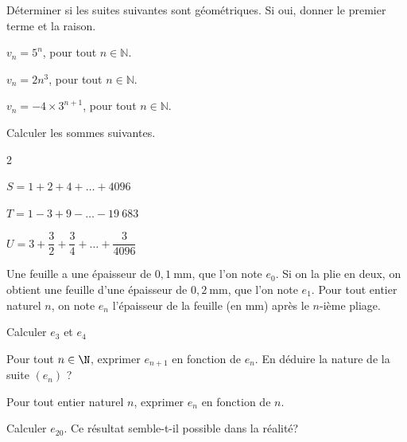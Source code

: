 \documentclass[12pt,a4paper]{article}  %
\begin{document}

Déterminer si les suites suivantes sont géométriques. Si oui, donner le premier terme et la raison.

\begin{enumMet}
	\item {} $v_n=5^n$, pour tout $n \in \mathbb{N}$.
	\item $v_n=2n^3$, pour tout $n \in \mathbb{N}$.
	\item $v_n=-4 \times 3^{n+1}$, pour tout $n \in \mathbb{N}$.
\end{enumMet}



Calculer les sommes suivantes.
\begin{multicols}{2}
	\begin{enumMet}
		\item {} $S=1+2+4+\ldots+4096$
		\item $T=1-3+9-\ldots-19\ 683$
		\item $U=3+\dfrac{3}{2}+\dfrac{3}{4}+\ldots+\dfrac{3}{4096}$
	\end{enumMet}
\end{multicols}


Une feuille a une épaisseur de $0,1 \mathrm{~mm}$, que l'on note $e_0$. Si on la plie en deux, on obtient une feuille d'une épaisseur de $0,2 \mathrm{~mm}$, que l'on note $e_1$. Pour tout entier naturel $n$, on note $e_n$ l'épaisseur de la feuille (en mm) après le $n$-ième pliage.
\begin{enumMet}
	\item Calculer $e_3$ et $e_4$
	\item Pour tout $n \in \N$, exprimer $e_{n+1}$ en fonction de $e_n$. En déduire la nature de la suite $\left(e_n\right)$ ?
	\item Pour tout entier naturel $n$, exprimer $e_n$ en fonction de $n$.
	\item Calculer $e_{20}$. Ce résultat semble-t-il possible dans la réalité?
\end{enumMet}
\end{document}
